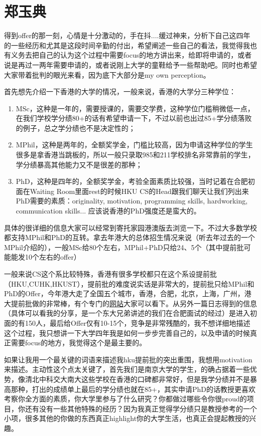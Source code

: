 \section{郑玉典}
得到offer的那一刻，心情是十分激动的，手在抖....缓过神来，分析下自己这四年的一些经历和尤其是这段时间辛勤的付出，希望阐述一些自己的看法，我觉得我也有义务去把自己的认为这个过程中需要focus的地方讲出来，给即将申请的，或者说是再过一两年需要申请的，或者说刚上大学的童鞋给予一些帮助吧。同时也希望大家带着批判的眼光来看，因为底下大部分是my own perception。\par

首先想先介绍一下香港的大学的情况，一般来说，香港的大学分三种学位：
\begin{enumerate}
\item MSc，这种是一年的，需要授课的，需要交学费，这种学位门槛稍微低一点，在我们学校学分绩80+的话有希望申请一下，不过以前也出过85+学分绩落败的例子，总之学分绩也不是决定性的；
\item MPhil，这种是两年的，全额奖学金，门槛比较高，因为申请这种学位的学生很多是拿香港当跳板的，所以一般只录取985和211学校排名非常靠前的学生，学分绩暴高其他能力又不是很差的那种；
\item PhD，这种是四年的，全额奖学金，考验全面素质比较强，当时记着在合肥初面在Waiting Room里面rest的时候HKU CS的Head跟我们聊天让我们列出来PhD需要的素质：originality, motivation, programming skills, hardworking, communication skills... 应该说香港的PhD强度还是蛮大的。
\end{enumerate}
\par
具体的很详细的信息大家可以经常到寄托家园港澳版去浏览一下。不过大多数学校都支持MPhil和PhD的互转。拿去年港大的总体招生情况来说（听去年过去的一个MPhil介绍的），一般MSc给80个左右，MPhil+PhD只给24、5个（其中提前批可能能发10个左右的offer）\par

一般来说CS这个系比较特殊，香港有很多学校都只在这个系设提前批（HKU,CUHK,HKUST），提前批的难度说实话是非常大的，提前批只给MPhil和PhD的Offer，今年港大走了全国五个城市，香港，合肥，北京，上海，广州，港大提前批做的非常棒，有个专门的\href{http://i.cs.hku.hk/~gradappl/index.html}{网站}大家可以看下。从另外一篇日志得到的信息（具体可以看我的分享，是一个东大兄弟讲述的我们在合肥面试的经过）是进入初面的有150人，最后给Offer仅有10-15个，竞争是非常残酷的，我不想详细地描述这个过程，我只想讲一下大学四年我是如何一步步完善自己的，以及申请的时候真正需要focus的地方，我觉得这个是最主要的。\par

如果让我用一个最关键的词语来描述我hku提前批的突出重围，我想用motivation来描述。主动性这个点太关键了，首先我们是南京大学的学生，的确占据着一些优势，像清北中科交大南大这些学校在香港的口碑都非常好，但是我学分绩并不是暴高那种，打出的成绩单上最后的学分绩也就在85+，其实申请PhD的话教授更喜欢考察你全方面的素质，你大学里参与了什么研究？你都做过哪些令你很proud的项目，你还有没有一些其他特殊的经历？因为我真正觉得学分绩只是教授参考的一个小项，很多其他的你做的东西真正highlight你的大学生活，也真正会提起教授的兴趣。\par

